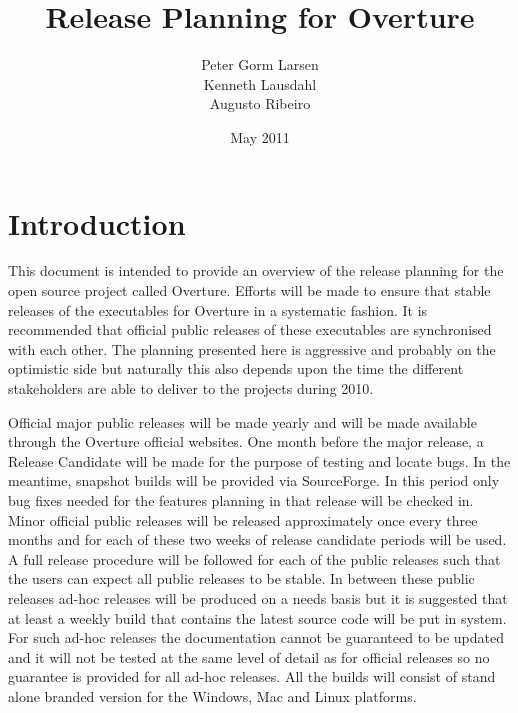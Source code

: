 \documentclass{overturerep}
\begin{document}
 
\title{Release Planning for Overture}
\author{Peter Gorm Larsen\\
        Kenneth Lausdahl\\
        Augusto Ribeiro}

\date{May 2011}

{}     

\maketitle
\tableofcontents
\newpage
% 




\setcounter{page}{1}

\chapter{Introduction}

This document is intended to provide an overview of the release
planning for the open source project called Overture. Efforts will be
made to ensure that stable releases of the executables for
Overture in a systematic fashion. It is recommended that
official public releases of these executables are synchronised with
each other. The planning presented here is aggressive and probably on
the optimistic side but naturally this also depends upon the time the
different stakeholders are able to deliver to the projects during
2010.

Official major public releases will be made yearly and will be made
available through the Overture official websites.  One month before
the major release, a Release Candidate will be made for the purpose of
testing and locate bugs. In the meantime, snapshot builds will be
provided via SourceForge. In this period only bug fixes needed for the
features planning in that release will be checked in. Minor official
public releases will be released approximately once every three months
and for each of these two weeks of release candidate periods will be
used. A full release procedure will be followed for each of the public
releases such that the users can expect all public releases to be
stable.  In between these public releases ad-hoc releases will be
produced on a needs basis but it is suggested that at least a weekly
build that contains the latest source code will be put in system. For
such ad-hoc releases the documentation cannot be guaranteed to be
updated and it will not be tested at the same level of detail as for
official releases so no guarantee is provided for all ad-hoc
releases. All the builds will consist of stand alone branded version
for the Windows, Mac and Linux platforms.
\end{document}

